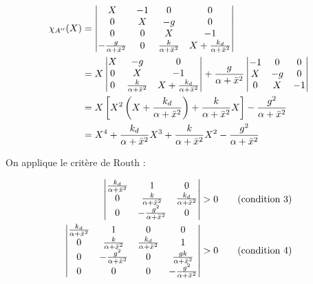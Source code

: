 \documentclass[10pt]{article}
\begin{document}
\begin{align}
	\chi_{A''} (X) &=
	\begin{vmatrix}
		X & -1 & 0 & 0 \\
		0 & X & -g & 0 \\
		0 & 0 & X & -1 \\
		- \frac{g}{\alpha + \bar x^2} & 0 & \frac{k}{\alpha + \bar x^2} & X + \frac{k_d}{\alpha + \bar x^2}
	\end{vmatrix} \notag \\
	&= X \begin{vmatrix}
		X & -g & 0 \\
		0 & X & -1 \\
		0 & \frac{k}{\alpha + \bar x^2} & X + \frac{k_d}{\alpha + \bar x^2}
	\end{vmatrix} + 
	\frac{g}{\alpha + \bar x^2} \begin{vmatrix}
		-1 & 0 & 0 \\
		X & -g & 0 \\
		0 & X & -1
	\end{vmatrix} \notag \\
	&= X \left[ X^2 \left( X + \frac{k_d}{\alpha + \bar x^2} \right) + \frac{k}{\alpha + \bar x^2} X \right]
		- \frac{g^2}{\alpha + \bar x^2} \notag \\
	&= X^4 + \frac{k_d}{\alpha + \bar x^2} X^3 +  \frac{k}{\alpha + \bar x^2} X^2
		- \frac{g^2}{\alpha + \bar x^2} \notag
\end{align}

\noindent On applique le critère de Routh :

\begin{align}
	\begin{vmatrix}
		\frac{k_d}{\alpha + \bar x^2} & 1 & 0 \\
		0 & \frac{k}{\alpha + \bar x^2} &\frac{k_d}{\alpha + \bar x^2} \\
		0 & - \frac{g^2}{\alpha + \bar x^2} & 0
	\end{vmatrix}
	&> 0 \tag{\text{condition} 3} \\
	\begin{vmatrix}
		\frac{k_d}{\alpha + \bar x^2} & 1 & 0 & 0 \\
		0 & \frac{k}{\alpha + \bar x^2} &\frac{k_d}{\alpha + \bar x^2} & 1 \\
		0 & - \frac{g^2}{\alpha + \bar x^2} & 0 & \frac{gk}{\alpha + \bar x^2} \\
		0 & 0 & 0 & - \frac{g^2}{\alpha + \bar x^2}
	\end{vmatrix}
	&> 0 \tag{\text{condition} 4}
\end{align}
\end{document}
